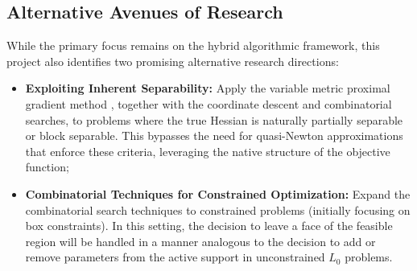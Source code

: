 \subsection{Alternative Avenues of Research}
While the primary focus remains on the hybrid algorithmic framework, this project also identifies two promising alternative research directions:
\begin{itemize}
    \item \textbf{Exploiting Inherent Separability:} Apply the variable metric proximal gradient method \cite{Leconte_2024}, together with the coordinate descent and combinatorial searches, to problems where the true Hessian is naturally partially separable or block separable. This bypasses the need for quasi-Newton approximations that enforce these criteria, leveraging the native structure of the objective function;
    \item \textbf{Combinatorial Techniques for Constrained Optimization:} Expand the combinatorial search techniques to constrained problems (initially focusing on box constraints). In this setting, the decision to leave a face of the feasible region will be handled in a manner analogous to the decision to add or remove parameters from the active support in unconstrained $L_0$ problems.
\end{itemize}

